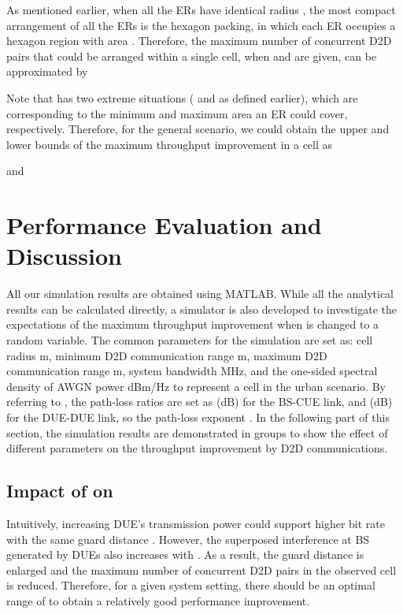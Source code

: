 \documentclass[journal, 10pt]{IEEEtran}
\begin{document}
As mentioned earlier, when all the ERs have identical radius
, the most compact arrangement of all the ERs is the
hexagon packing, in which each ER occupies a hexagon region with area
. Therefore, the maximum number of concurrent
D2D pairs that could be arranged within a single cell, when  and
 are given, can be approximated by

Note that  has two extreme situations 
( and  as defined earlier), 
which are corresponding to the minimum and maximum area an ER could cover, 
respectively. Therefore, for the general scenario, we could obtain the 
upper and lower bounds of the maximum throughput improvement in a cell as

and
 


\section{Performance Evaluation and Discussion}\label{sec:eval}

All our simulation results are obtained using MATLAB. While all the
analytical results can be calculated directly, a simulator is also
developed to investigate the expectations of the maximum throughput
improvement when  is changed to a random variable. The
common parameters for the simulation are set as: cell radius
 m, minimum D2D communication range 
m, maximum D2D communication range  m, system
bandwidth  MHz, and the one-sided spectral density of AWGN
power  dBm/Hz to represent a cell in the urban scenario.
By referring to \cite{3GPP}, the path-loss ratios are set as
 (dB) for the BS-CUE link,
and  (dB) for the DUE-DUE link, so
the path-loss exponent . In the following part of this
section, the simulation results are demonstrated in groups to show the
effect of different parameters on the throughput improvement by D2D
communications.


\subsection{Impact of  on 
}\label{sec:Simu-1}

Intuitively, increasing DUE's transmission power 
could support higher bit rate  with the same guard distance
. However, the superposed interference at BS generated
by DUEs also increases with . As a result, the guard
distance  is enlarged and the maximum number of
concurrent D2D pairs in the observed cell is reduced. Therefore, for a
given system setting, there should be an optimal range of
 to obtain a relatively good performance improvement.
\end{document}
